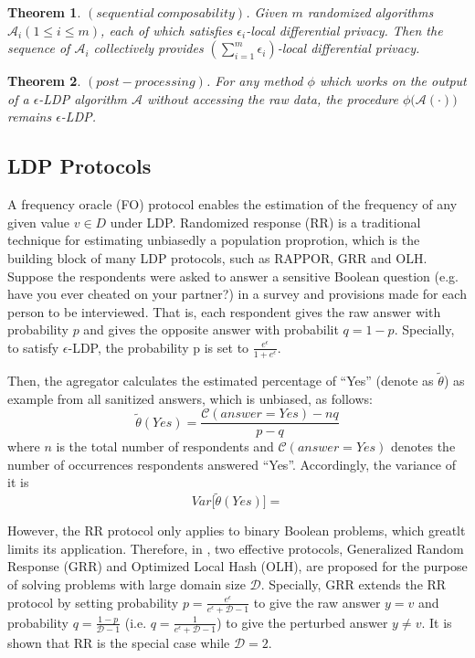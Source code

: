 \documentclass[conference]{IEEEtran}
\begin{document}
\newtheorem{theorem}{\bf Theorem}[section]
\begin{theorem}\label{sequential composability}
$(sequential\ composability)$. Given $m$ randomized algorithms $\mathcal{A}_i(1 \leq i \leq m)$, each of which satisfies $\epsilon_i$-local differential privacy. Then the sequence of $\mathcal{A}_i$ collectively provides $(\sum_{i=1}^{m} \epsilon_i)$-local differential privacy. 
\end{theorem}

\begin{theorem}\label{post processing}
$(post-processing)$. For any method $\phi$ which works on the output of a $\epsilon$-LDP algorithm $\mathcal{A}$ without accessing the raw data, the procedure $\phi \big(\mathcal{A(\cdot)} \big)$ remains $\epsilon$-LDP.
\end{theorem}


\subsection{LDP Protocols}
A frequency oracle (FO) protocol enables the estimation of the frequency of any given value $v \in D$ under LDP. Randomized response (RR)\cite{rr} is a traditional technique for estimating unbiasedly a population proprotion, which is the building block of many LDP protocols, such as RAPPOR\cite{rappor}, GRR and OLH\cite{a8}. Suppose the respondents were asked to answer a sensitive Boolean question (e.g. have you ever cheated on your partner?) in a survey and provisions made for each person to be interviewed. That is, each respondent gives the raw answer with probability $p$ and gives the opposite answer with probabilit $q = 1-p$. Specially, to satisfy $\epsilon$-LDP, the probability p is set to $\frac{e^{\epsilon}}{1+e^{\epsilon}}$. 

Then, the agregator calculates the estimated percentage of ``Yes'' (denote as $\tilde{\theta}$) as example  from all sanitized answers, which is unbiased, as follows: 
$$\tilde{\theta}(Yes) = \frac{\mathcal{C}(answer=Yes) - nq}{p-q}$$
where $n$ is the total number of respondents and $\mathcal{C}(answer=Yes)$ denotes the number of occurrences respondents answered ``Yes''. Accordingly, the variance of it is 
$$Var \big[\tilde{\theta}(Yes) \big] = $$

However, the RR protocol only applies to binary Boolean problems, which greatlt limits its application. Therefore, in \cite{a8}, two effective protocols, Generalized Random Response (GRR) and Optimized Local Hash (OLH), are proposed for the purpose of solving problems with large domain size $\mathcal{D}$. Specially, GRR extends the RR protocol by setting probability $p = \frac{e^{\epsilon}}{e^{\epsilon} + \mathcal{D} - 1}$ to give the raw answer $y = v$ and probability $q = \frac{1-p}{\mathcal{D}-1}$ (i.e. $q =\frac{1}{e^{\epsilon} + \mathcal{D} - 1}$) to give the perturbed answer $y \neq v$. It is shown that RR is the special case while $\mathcal{D} = 2$. 
\end{document}
